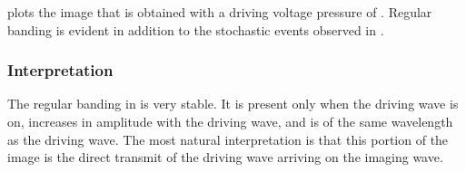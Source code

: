 






  plots the image that is obtained with a driving voltage pressure of \dbFifteen.
Regular banding is evident in addition to the stochastic events observed in .

\subsubsection{Interpretation}

The regular banding in  is very stable.
It is present only when the driving wave is on, increases in amplitude with the driving wave,
and is of the same wavelength as the driving wave.
The most natural interpretation is that this portion of the image is the 
direct transmit of the driving wave arriving on the imaging wave.

